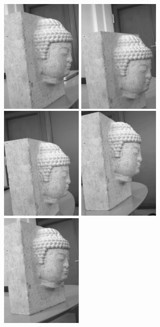 \begin{figure}
\begin{center}
\includegraphics[height=55mm]{FIGS/Boudhas/IMG_5564.jpg}
\includegraphics[height=55mm]{FIGS/Boudhas/IMG_5565.jpg}
\includegraphics[height=55mm]{FIGS/Boudhas/IMG_5566.jpg}
\includegraphics[height=55mm]{FIGS/Boudhas/IMG_5567.jpg}
\includegraphics[height=55mm]{FIGS/Boudhas/IMG_5568.jpg}

\end{center}
\end{figure}
